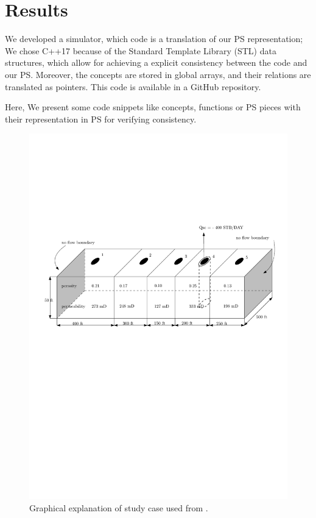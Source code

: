 \documentclass[review]{elsarticle}
\begin{document}
\section{Results}\label{sec:validation}
We developed a simulator, which code is a translation of our PS representation; We chose C++17 because of the Standard Template Library (STL) data structures, which allow for achieving a explicit consistency between the code and our PS. Moreover, the concepts are stored in global arrays, and their relations are translated as pointers. This code is available in a GitHub repository.

Here, We present some code snippets like concepts, functions or PS pieces with their representation in PS for verifying consistency. 



\begin{figure}
	\centering
	\includegraphics[width=1.0\textwidth]{Figures/casoasis.pdf}
	\caption{Graphical explanation of study case used from \cite{jamal2006petroleum}.}
	\label{fig:casoasis}
\end{figure}
\end{document}
